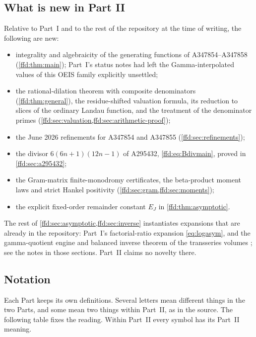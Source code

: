 \documentclass[11pt]{article}
\theoremstyle{definition}
\theoremstyle{remark}
\begin{document}
\subsection{What is new in Part II}\label{ffd:sec:new}
Relative to Part~I and to the rest of the repository at the time of writing,
the following are new:
\begin{itemize}[itemsep=2pt]
\item integrality and algebraicity of the generating functions of
  A347854--A347858 (\cref{ffd:thm:main}); Part~I's status notes had left the
  Gamma-interpolated values of this OEIS family explicitly unsettled;
\item the rational-dilation theorem with composite denominators
  (\cref{ffd:thm:general}), the residue-shifted valuation formula, its
  reduction to slices of the ordinary Landau function, and the treatment of
  the denominator primes (\cref{ffd:sec:valuation,ffd:sec:arithmetic-proof});
\item the June 2026 refinements for A347854 and A347855
  (\cref{ffd:sec:refinements});
\item the divisor $6(6n+1)(12n-1)$ of A295432, \eqref{ffd:eq:Bdivmain},
  proved in \cref{ffd:sec:a295432};
\item the Gram-matrix finite-monodromy certificates, the beta-product moment
  laws and strict Hankel positivity (\cref{ffd:sec:gram,ffd:sec:moments});
\item the explicit fixed-order remainder constant $E_J$ in
  \cref{ffd:thm:asymptotic}.
\end{itemize}
The rest of \cref{ffd:sec:asymptotic,ffd:sec:inverse} instantiates
expansions that are already in the repository: Part~I's factorial-ratio
expansion \eqref{eq:logasym}, and the gamma-quotient engine and
balanced inverse theorem of the transseries volumes \cite{ffd-cti,ffd-tai};
see the notes in those sections. Part~II claims no novelty there.

\subsection{Notation}\label{ffd:sec:notation}
Each Part keeps its own definitions. Several letters mean different things
in the two Parts, and some mean two things within Part~II, as in the source.
The following table fixes the reading. Within Part~II every symbol has its
Part~II meaning.
\end{document}
